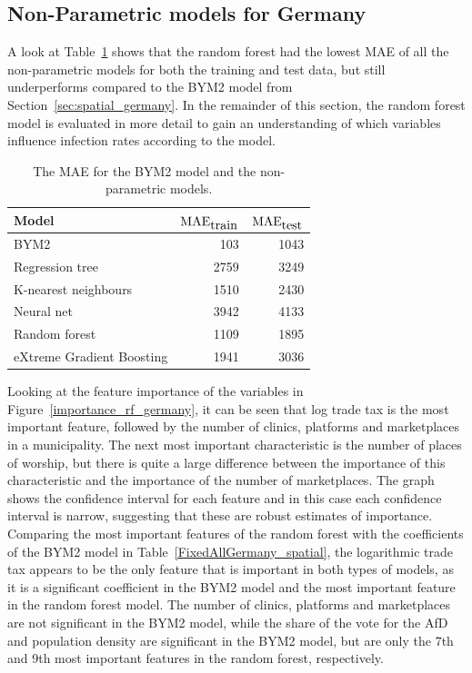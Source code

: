 \subsection{Non-Parametric models for Germany}
A look at Table~\ref{pred_perf} shows that the random forest had the lowest MAE of all the non-parametric models for both the training and test data, but still underperforms compared to the BYM2 model from Section~\ref{sec:spatial_germany}. In the remainder of this section, the random forest model is evaluated in more detail to gain an understanding of which variables influence infection rates according to the model.
\begin{table}[H] 
\caption{The MAE for the BYM2 model and the non-parametric models. \label{pred_perf}}
\begin{tabular}{l r r}
\toprule
\textbf{Model}	& \textbf{$\hbox{MAE}_{\hbox{train}}$} & \textbf{$\hbox{MAE}_{\hbox{test}}$}\\
\midrule
BYM2 & 103 & 1043\\
Regression tree & 2759 & 3249 \\
K-nearest neighbours & 1510 & 2430 \\
Neural net & 3942 & 4133 \\
Random forest & 1109 & 1895 \\
eXtreme Gradient Boosting & 1941 & 3036 \\
\bottomrule
\end{tabular}
\end{table}
Looking at the feature importance of the variables in Figure~\ref{importance_rf_germany}, it can be seen that log trade tax is the most important feature, followed by the number of clinics, platforms and marketplaces in a municipality. The next most important characteristic is the number of places of worship, but there is quite a large difference between the importance of this characteristic and the importance of the number of marketplaces. The graph shows the confidence interval for each feature and in this case each confidence interval is narrow, suggesting that these are robust estimates of importance. Comparing the most important features of the random forest with the coefficients of the BYM2 model in Table~\ref{FixedAllGermany_spatial}, the logarithmic trade tax appears to be the only feature that is important in both types of models, as it is a significant coefficient in the BYM2 model and the most important feature in the random forest model. The number of clinics, platforms and marketplaces are not significant in the BYM2 model, while the share of the vote for the AfD and population density are significant in the BYM2 model, but are only the 7th and 9th most important features in the random forest, respectively. \clearpage
